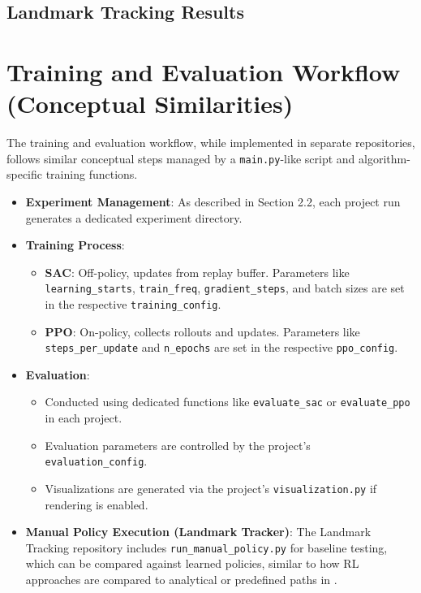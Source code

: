 \documentclass[11pt,a4paper]{article}
\newcommand{\code}[1]{\texttt{#1}} %
\begin{document}
\subsection{Landmark Tracking Results}

\section{Training and Evaluation Workflow (Conceptual Similarities)}
The training and evaluation workflow, while implemented in separate repositories, follows similar conceptual steps managed by a \code{main.py}-like script and algorithm-specific training functions.
\begin{itemize}
    \item \textbf{Experiment Management}: As described in Section 2.2, each project run generates a dedicated experiment directory.
    \item \textbf{Training Process}:
        \begin{itemize}
            \item \textbf{SAC}: Off-policy, updates from replay buffer. Parameters like \code{learning\_starts}, \code{train\_freq}, \code{gradient\_steps}, and batch sizes are set in the respective \code{training\_config}.
            \item \textbf{PPO}: On-policy, collects rollouts and updates. Parameters like \code{steps\_per\_update} and \code{n\_epochs} are set in the respective \code{ppo\_config}.
        \end{itemize}
    \item \textbf{Evaluation}:
        \begin{itemize}
            \item Conducted using dedicated functions like \code{evaluate\_sac} or \code{evaluate\_ppo} in each project.
            \item Evaluation parameters are controlled by the project's \code{evaluation\_config}.
            \item Visualizations are generated via the project's \code{visualization.py} if rendering is enabled.
        \end{itemize}
    \item \textbf{Manual Policy Execution (Landmark Tracker)}: The Landmark Tracking repository includes \code{run\_manual\_policy.py} for baseline testing, which can be compared against learned policies, similar to how RL approaches are compared to analytical or predefined paths in \cite{masmitja2023tracking}.
\end{itemize}
\end{document}
